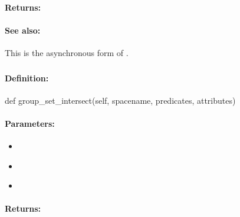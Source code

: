 \paragraph{Returns:}


\paragraph{See also:}  This is the asynchronous form of .

\pagebreak
\subsubsection{}
\label{api:python:group_set_intersect}


\paragraph{Definition:}
\begin{pythoncode}
def group_set_intersect(self, spacename, predicates, attributes)
\end{pythoncode}

\paragraph{Parameters:}
\begin{itemize}[noitemsep]
\item {}\\

\item {}\\

\item {}\\

\end{itemize}

\paragraph{Returns:}


\pagebreak
\subsubsection{}
\label{api:python:async_group_set_intersect}


